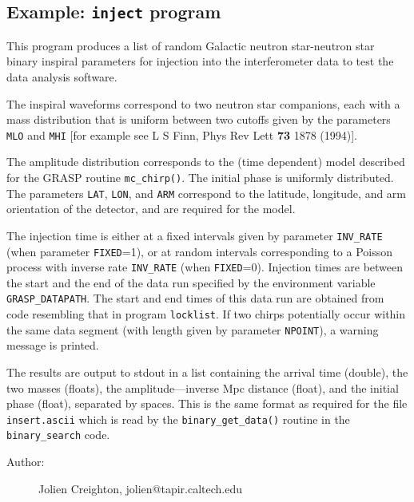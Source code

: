 \subsection{Example: \texttt{inject} program}
\label{ss:insert}
This program produces a list of random Galactic neutron star-neutron star
binary inspiral
parameters for injection into the interferometer data to test the data
analysis software.

The inspiral waveforms correspond to two neutron star companions, each with a
mass distribution that is uniform between two cutoffs given by the parameters
\texttt{MLO} and \texttt{MHI}
[for example see L S Finn, Phys Rev Lett \textbf{73} 1878 (1994)].

The amplitude distribution corresponds to the (time dependent) model
described for the GRASP routine \texttt{mc\_chirp()}.  The initial phase is
uniformly distributed.  The parameters \texttt{LAT}, \texttt{LON}, and
\texttt{ARM} correspond to the latitude, longitude, and arm orientation of the
detector, and are required for the model.

The injection time is either at a fixed intervals given by parameter
\texttt{INV\_RATE}
(when parameter \texttt{FIXED}=1), or at random intervals corresponding to a
Poisson process with inverse rate \texttt{INV\_RATE} (when \texttt{FIXED}=0).
Injection times are between the start and the end of the data run specified
by the environment variable \texttt{GRASP\_DATAPATH}.  The start and end times
of this data run are obtained from code resembling that in program
\texttt{locklist}.  If two chirps potentially occur within the same data
segment (with length given by parameter \texttt{NPOINT}), a warning message is
printed.

The results are output to stdout in a list containing the arrival time
(double), the two masses (floats), the amplitude---inverse Mpc distance
(float), and the initial phase (float), separated by spaces.  This is the
same format as required for the file \texttt{insert.ascii} which is read by
the \texttt{binary\_get\_data()} routine in the \texttt{binary\_search} code.

\begin{description}
\item[Author:] Jolien Creighton, jolien@tapir.caltech.edu
\end{description}

\clearpage
{}


